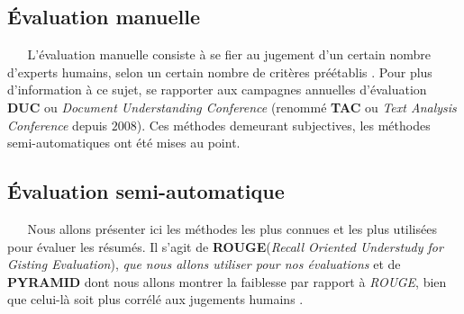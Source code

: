 \subsection{Évaluation manuelle}
$ _{} $ $ _{} $ $ _{} $ $ _{} $ $ _{} $L'évaluation manuelle consiste à se fier au jugement d'un certain nombre d'experts humains, selon un certain nombre de critères préétablis \cite{torres2014automatic}. Pour plus d'information à ce sujet, se rapporter aux campagnes annuelles d'évaluation \textbf{DUC} ou \textit{Document Understanding Conference} (renommé \textbf{TAC} \cite{TAC} ou \textit{Text Analysis Conference} depuis $ 2008 $). Ces méthodes demeurant subjectives, les méthodes semi-automatiques ont été mises au point.
\subsection{Évaluation semi-automatique}
$ _{} $ $ _{} $ $ _{} $ $ _{} $ $ _{} $Nous allons présenter ici les méthodes les plus connues et les plus utilisées \cite{hong2014repository} pour évaluer les résumés. Il s'agit de \textbf{ROUGE}(\textit{Recall Oriented Understudy for Gisting Evaluation}), \textit{que nous allons utiliser pour nos évaluations} et de \textbf{PYRAMID} dont nous allons montrer la faiblesse par rapport à \textit{ROUGE}, bien que celui-là soit plus corrélé aux jugements humains \cite{nenkova2004evaluating}.
